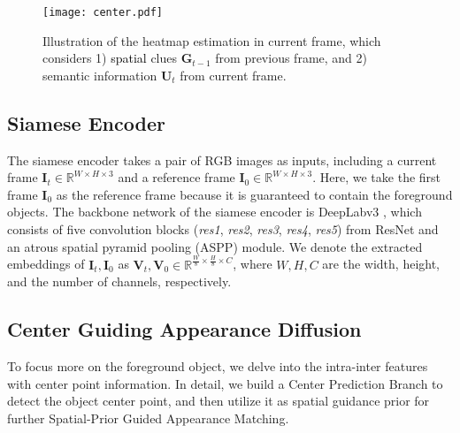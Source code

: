 \documentclass[letterpaper]{article} \usepackage{aaai20}  \usepackage{times}  \usepackage{helvet} \usepackage{courier}  \usepackage[hyphens]{url}  \usepackage{graphicx} \urlstyle{rm} \def\UrlFont{\rm}  \usepackage{graphicx}  \frenchspacing  \setlength{\pdfpagewidth}{8.5in}  \setlength{\pdfpageheight}{11in}  \usepackage{amssymb}
\newcommand{\ldz}[1]{\textcolor{black}{#1}}
\begin{document}
\begin{figure}[t!]
\centering
\texttt{[image: center.pdf]}
\caption{Illustration of the heatmap estimation in current frame, which considers 1) \ldz{spatial} clues $\bm{G}_{t-1}$ from previous frame, and 2) semantic information $\bm{U}_t$ from current frame.}
\label{fig:center}
\vspace{-12pt}
\end{figure}

\subsection{Siamese Encoder}
The siamese encoder takes a pair of RGB images as inputs, including a current frame $\bm{I}_t \in \mathbb{R}^{W\times H \times 3}$ and a reference frame $\bm{I}_0 \in \mathbb{R}^{W\times H \times 3}$.
Here, we take the first frame $\bm{I}_0$ as the reference frame because it is guaranteed to contain the foreground objects.
The backbone network of the siamese encoder is DeepLabv3 \cite{chen2017rethinking}, which consists of five convolution blocks (\textit{res1}, \textit{res2}, \textit{res3}, \textit{res4}, \textit{res5}) from ResNet \cite{he2016deep} and an atrous spatial pyramid pooling (ASPP) module. We denote the extracted embeddings of $\bm{I}_t,\bm{I}_0$ as $\bm{V}_t,\bm{V}_0 \in \mathbb{R}^{\frac{W}{8}\times \frac{H}{8} \times C}$, where $W,H,C$ are the width, height, and the number of channels, respectively.

\subsection{Center Guiding Appearance Diffusion}
To focus more on the foreground object, we delve into the intra-inter features with center point information. In detail, we build a Center Prediction Branch to detect the object center point, and then utilize it as spatial guidance prior for further Spatial-Prior Guided Appearance Matching.
\end{document}
